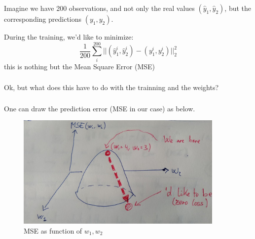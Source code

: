 \documentclass{beamer}
\begin{document}
\begin{frame}
    \frametitle{\insertsection}
    \framesubtitle{\insertsubsection}

    Imagine we have 200 observations, and not only the real values $(\hat{y}_1,\hat{y}_2)$, but the corresponding predictions $(y_1,y_2)$.

    \vfill
    During the training, we'd like to minimize:
    \begin{equation}
        \frac{1}{200}\sum_i^{200} ||(\hat{y}_1^i,\hat{y}_2^i) - (y_1^i, y_2^i)||_2^2
        \label{eq:mse}
    \end{equation}
    this is nothing but the Mean Square Error (MSE)

\end{frame}




\begin{frame}
    \frametitle{\insertsection}
    \framesubtitle{\insertsubsection}

    Ok, but what does this have to do with the trainning and the weights?



\end{frame}



\begin{frame}
    \frametitle{\insertsection}
    \framesubtitle{\insertsubsection}

    One can draw the prediction error (MSE in our case) as below.


    \begin{figure}
        \centering
        \includegraphics[width=0.9\textwidth]{img/gradient-descend.jpg}
        \caption{MSE as function of $w_1,w_2$}
        \label{fig:trained-nn-2}
    \end{figure}
\end{frame}
\end{document}
